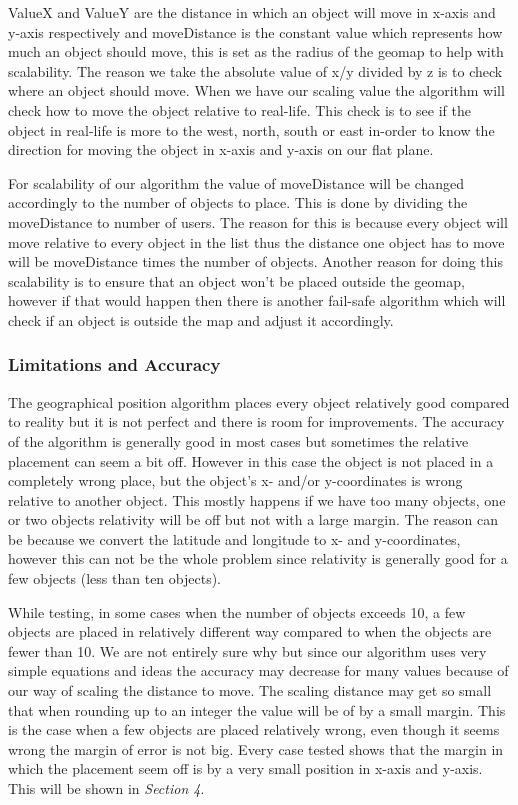 \documentclass[9pt,a4paper]{acmproc}
\begin{document}
ValueX and ValueY are the distance in which an object will move in x-axis and y-axis respectively and moveDistance is the constant value which represents how much an object should move, this is set as the radius of the geomap to help with scalability. The reason we take the absolute value of x/y divided by z is to check where an object should move. When we have our scaling value the algorithm will check how to move the object relative to real-life. This check is to see if the object in real-life is more to the west, north, south or east in-order to know the direction for moving the object in x-axis and y-axis on our flat plane.

For scalability of our algorithm the value of moveDistance will be changed accordingly to the number of objects to place. This is done by dividing the moveDistance to number of users. The reason for this is because every object will move relative to every object in the list thus the distance one object has to move will be moveDistance times the number of objects. Another reason for doing this scalability is to ensure that an object won't be placed outside the geomap, however if that would happen then there is another fail-safe algorithm which will check if an object is outside the map and adjust it accordingly.

\subsubsection{Limitations and Accuracy}
The geographical position algorithm places every object relatively good compared to reality but it is not perfect and there is room for improvements. The accuracy of the algorithm is generally good in most cases but sometimes the relative placement can seem a bit off. However in this case the object is not placed in a completely wrong place, but the object's x- and/or y-coordinates is wrong relative to another object. This mostly happens if we have too many objects, one or two objects relativity will be off but not with a large margin. The reason can be because we convert the latitude and longitude to x- and y-coordinates, however this can not be the whole problem since relativity is generally good for a few objects (less than ten objects).

While testing, in some cases when the number of objects exceeds 10, a few objects are placed in relatively different way compared to when the objects are fewer than 10. We are not entirely sure why but since our algorithm uses very simple equations and ideas the accuracy may decrease for many values because of our way of scaling the distance to move. The scaling distance may get so small that when rounding up to an integer the value will be of by a small margin. This is the case when a few objects are placed relatively wrong, even though it seems wrong the margin of error is not big. Every case tested shows that the margin in which the placement seem off is by a very small position in x-axis and y-axis. This will be shown in \textit{Section 4}.
\end{document}
